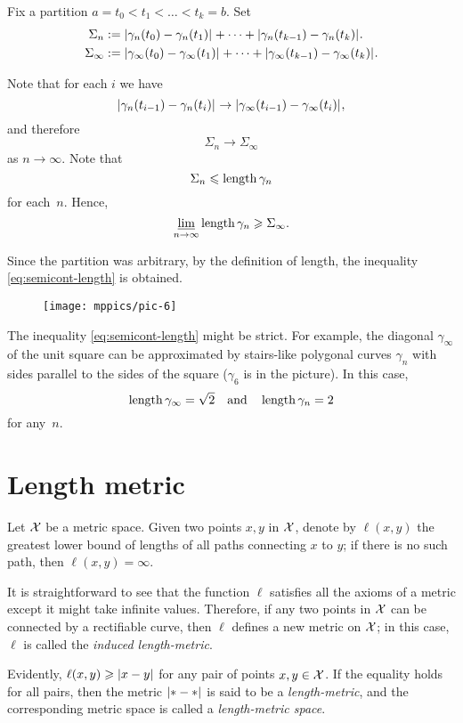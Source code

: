 Fix a partition $a=t_0<t_1<\dots<t_k=b$.
Set 
\begin{align*}\Sigma_n
&\df
\dist{\gamma_n(t_0)}{\gamma_n(t_1)}{}
+\dots+
\dist{\gamma_n(t_{k-1})}{\gamma_n(t_k)}{}.
\\
\Sigma_\infty
&\df
\dist{\gamma_\infty(t_0)}{\gamma_\infty(t_1)}{}
+\dots+
\dist{\gamma_\infty(t_{k-1})}{\gamma_\infty(t_k)}{}.
\end{align*}

Note that for each $i$ we have 
\[\dist{\gamma_n(t_{i-1})}{\gamma_n(t_i)}{}
\to
\dist{\gamma_\infty(t_{i-1})}{\gamma_\infty(t_i)}{},\]
and therefore
\[\Sigma_n\to \Sigma_\infty\] 
as $n\to\infty$.
Note that 
\[\Sigma_n\leqslant\mathop{\rm length}\nolimits\gamma_n\]
for each~$n$.
Hence,
$$\varliminf_{n\to\infty} \mathop{\rm length}\nolimits\gamma_n \geqslant \Sigma_\infty.$$

  
Since the partition was arbitrary, by the definition of length, the inequality  \ref{eq:semicont-length} is obtained.
\qeds


\begin{wrapfigure}{o}{20 mm}
\vskip3mm
\centering
\texttt{[image: mppics/pic-6]}
\end{wrapfigure}


The inequality \ref{eq:semicont-length} might be strict.
For example, the diagonal $\gamma_\infty$ of the unit square 
can be approximated by stairs-like polygonal curves $\gamma_n$
with sides parallel to the sides of the square ($\gamma_6$ is in the picture).
In this case,
\[\mathop{\rm length}\nolimits\gamma_\infty=\sqrt{2}\quad
\text{and}\quad \mathop{\rm length}\nolimits\gamma_n=2\]
for any~$n$.



\section{Length metric}\label{sec:Length metric}

Let $\mathcal{X}$ be a metric space.
Given two points $x,y$ in $\mathcal{X}$, denote by $\ell(x,y)$ the greatest lower bound of lengths of all paths connecting $x$ to $y$; if there is no such path, then $\ell(x,y)=\infty$.

It is straightforward to see that the function $\ell$ satisfies all the axioms of a metric except it might take infinite values.
Therefore, if any two points in $\mathcal{X}$ can be connected by a rectifiable curve, then $\ell$ defines a new metric on $\mathcal{X}$;
in this case, $\ell$ is called the \emph{induced length-metric}.

Evidently, $\ell(x,y)\ge \dist{x}{y}{}$ for any pair of points $x,y\in \mathcal{X}$.
If the equality holds for all pairs, then the metric $\dist{{*}}{{*}}{}$ is said to be a \emph{length-metric}, and the corresponding metric space is called a \index{}\emph{length-metric space}.

